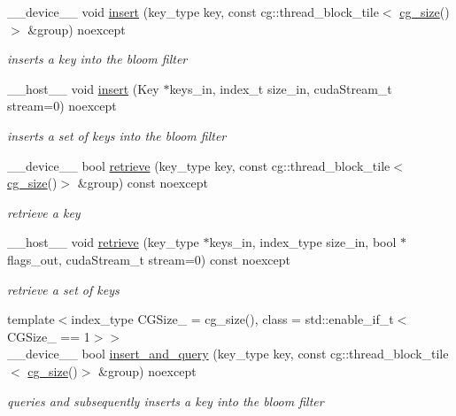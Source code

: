\begin{DoxyCompactItemize}
\+\_\+\+\_\+device\+\_\+\+\_\+ void \hyperlink{classwarpcore_1_1BloomFilter_a8567325cd30886f3daf2c615a35bb02e}{insert} (key\+\_\+type key, const cg\+::thread\+\_\+block\+\_\+tile$<$ \hyperlink{classwarpcore_1_1BloomFilter_a6ad2335811852ad62fc65e85416d3904}{cg\+\_\+size}()$>$ \&group) noexcept
\begin{DoxyCompactList}\small\item\em inserts a key into the bloom filter \end{DoxyCompactList}\item 
\+\_\+\+\_\+host\+\_\+\+\_\+ void \hyperlink{classwarpcore_1_1BloomFilter_a462859be5ed949c82d37909b139271ee}{insert} (Key $\ast$keys\+\_\+in, index\+\_\+t size\+\_\+in, cuda\+Stream\+\_\+t stream=0) noexcept
\begin{DoxyCompactList}\small\item\em inserts a set of keys into the bloom filter \end{DoxyCompactList}\item 
\+\_\+\+\_\+device\+\_\+\+\_\+ bool \hyperlink{classwarpcore_1_1BloomFilter_a47ffce0fc70aa6bd7a0ed4b837fec1bd}{retrieve} (key\+\_\+type key, const cg\+::thread\+\_\+block\+\_\+tile$<$ \hyperlink{classwarpcore_1_1BloomFilter_a6ad2335811852ad62fc65e85416d3904}{cg\+\_\+size}()$>$ \&group) const noexcept
\begin{DoxyCompactList}\small\item\em retrieve a key \end{DoxyCompactList}\item 
\+\_\+\+\_\+host\+\_\+\+\_\+ void \hyperlink{classwarpcore_1_1BloomFilter_a38025d88272e7de413210efe745aa279}{retrieve} (key\+\_\+type $\ast$keys\+\_\+in, index\+\_\+type size\+\_\+in, bool $\ast$flags\+\_\+out, cuda\+Stream\+\_\+t stream=0) const noexcept
\begin{DoxyCompactList}\small\item\em retrieve a set of keys \end{DoxyCompactList}\item 
{\footnotesize template$<$index\+\_\+type C\+G\+Size\+\_\+ = cg\+\_\+size(), class  = std\+::enable\+\_\+if\+\_\+t$<$\+C\+G\+Size\+\_\+ == 1$>$$>$ }\\\+\_\+\+\_\+device\+\_\+\+\_\+ bool \hyperlink{classwarpcore_1_1BloomFilter_a6dc903341218173f276cc855ba683ad1}{insert\+\_\+and\+\_\+query} (key\+\_\+type key, const cg\+::thread\+\_\+block\+\_\+tile$<$ \hyperlink{classwarpcore_1_1BloomFilter_a6ad2335811852ad62fc65e85416d3904}{cg\+\_\+size}()$>$ \&group) noexcept
\begin{DoxyCompactList}\small\item\em queries and subsequently inserts a key into the bloom filter \end{DoxyCompactList}\item 

\end{DoxyCompactItemize}
